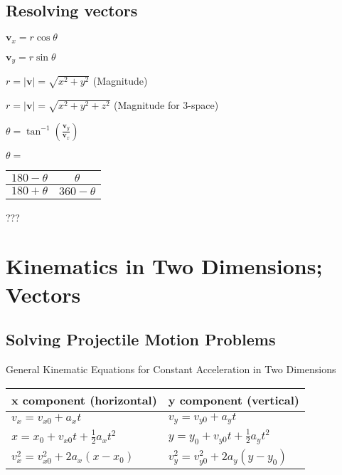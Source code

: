 \documentclass{extarticle}
\begin{document}
\subsection{Resolving vectors}

$\mathbf{v}_x=r\cos{\theta}$

$\mathbf{v}_y=r\sin{\theta}$

$r=\left|\mathbf{v}\right|=\sqrt{x^2+y^2}$ (Magnitude)

$r=\left|\mathbf{v}\right|=\sqrt{x^2+y^2+z^2}$ (Magnitude for 3-space)

$\theta=\tan^{-1}{(\frac{\mathbf{v}_y}{\mathbf{v}_x})}$


\begin{tcolorbox}[enhanced jigsaw,sharp corners,coltext=black,colback=BurntOrange!25!white,boxrule=0pt,breakable,size=minimal]

$\theta = $ \begin{tabu}{|c|c|}
    \hline
$180 - \theta$ & $\theta$ \\ \hline
$180 + \theta$ & $360 - \theta$ \\ \hline
    \end{tabu}???

\end{tcolorbox}

    
    
    
    
    
    
    
    
\section{Kinematics in
Two Dimensions; Vectors}
    
    
\subsection{Solving Projectile Motion Problems}

General Kinematic Equations for Constant Acceleration
in Two Dimensions


\begin{tabu}{XX}
x component (horizontal) & 
y component (vertical) \\
\hline
$v_x = v_{x0} + a_xt$ &
$v_y = v_{y0} + a_yt$ \\

$x = x_0 + v_{x0}t + \frac{1}{2}a_xt^2$ & 
$y = y_0 + v_{y0}t + \frac{1}{2}a_yt^2$ \\

$v_x^2 = v_{x0}^2 + 2a_x(x - x_0)$ & 
$v_y^2 = v_{y0}^2 + 2a_y(y - y_0)$ \\ \hline
\end{tabu}
\end{document}
